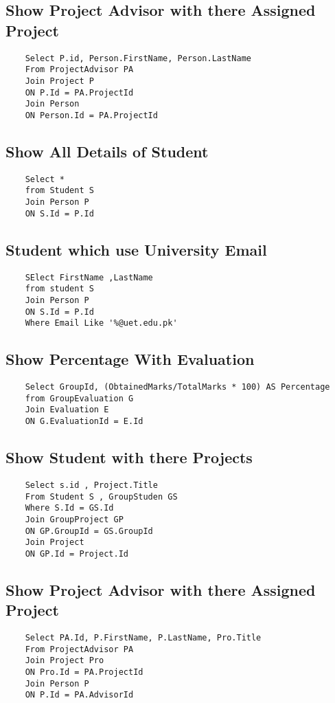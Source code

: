 \documentclass{article}
\begin{document}
\subsection{Show Project Advisor with there Assigned Project}
\begin{lstlisting}
    Select P.id, Person.FirstName, Person.LastName
    From ProjectAdvisor PA
    Join Project P
    ON P.Id = PA.ProjectId
    Join Person
    ON Person.Id = PA.ProjectId
\end{lstlisting}


\subsection{Show All Details of Student}
\begin{lstlisting}
    Select *
    from Student S
    Join Person P
    ON S.Id = P.Id
\end{lstlisting}

\subsection{Student which use University Email}
\begin{lstlisting}
    SElect FirstName ,LastName
    from student S
    Join Person P
    ON S.Id = P.Id
    Where Email Like '%@uet.edu.pk'
\end{lstlisting}

\subsection{Show Percentage With Evaluation}
\begin{lstlisting}
    Select GroupId, (ObtainedMarks/TotalMarks * 100) AS Percentage
    from GroupEvaluation G
    Join Evaluation E
    ON G.EvaluationId = E.Id
\end{lstlisting}

\subsection{Show Student with there Projects}
\begin{lstlisting}
    Select s.id , Project.Title
    From Student S , GroupStuden GS
    Where S.Id = GS.Id
    Join GroupProject GP
    ON GP.GroupId = GS.GroupId
    Join Project
    ON GP.Id = Project.Id
\end{lstlisting}


\subsection{Show Project Advisor with there Assigned Project}
\begin{lstlisting}
    Select PA.Id, P.FirstName, P.LastName, Pro.Title
    From ProjectAdvisor PA
    Join Project Pro
    ON Pro.Id = PA.ProjectId
    Join Person P
    ON P.Id = PA.AdvisorId
\end{lstlisting}
\end{document}
